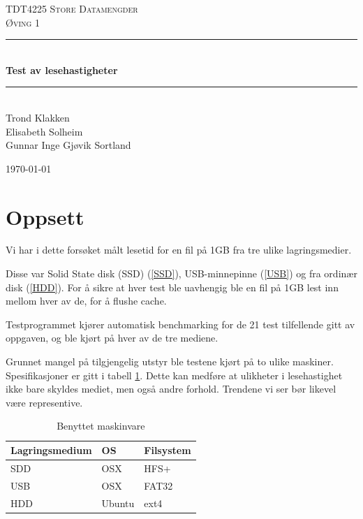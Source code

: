 \documentclass[titlepage]{article}
\newcommand{\HRule}{\rule{\linewidth}{0.5mm}}
\begin{document}
\begin{titlepage}
 
\begin{center}
 
\textsc{\LARGE TDT4225 Store Datamengder}\\[1.5cm]
\textsc{\Large Øving 1}\\[0.5cm]
 
\HRule \\[0.4cm]
{ \huge \bfseries Test av lesehastigheter}\\[0.4cm]
\HRule \\[1.5cm]

Trond Klakken \\
Elisabeth Solheim \\
Gunnar Inge Gjøvik Sortland

\vfill
 
{\large \today}
 
\end{center}

\end{titlepage}

\section{Oppsett}
Vi har i dette forsøket målt lesetid for en fil på 1GB fra tre ulike
lagringsmedier.

Disse var Solid State disk (SSD) (\ref{SSD}), USB-minnepinne
(\ref{USB}) og fra ordinær disk (\ref{HDD}). For å sikre at hver test
ble uavhengig ble en fil på 1GB lest inn mellom hver av de, for å
flushe cache.

Testprogrammet kjører automatisk benchmarking for de 21 test
tilfellende gitt av oppgaven, og ble kjørt på hver av de tre mediene.

Grunnet mangel på tilgjengelig utstyr ble testene kjørt på to ulike
maskiner. Spesifikasjoner er gitt i tabell \ref{tab:hardware}. Dette
kan medføre at ulikheter i lesehastighet ikke bare skyldes mediet, men
også andre forhold. Trendene vi ser bør likevel være representive.

\begin{table}[h!]
 \caption{Benyttet maskinvare}
 \label{tab:hardware}
  \centering
  \begin{tabular}{|l|l|l|}
\hline
\textbf{Lagringsmedium} & \textbf{OS} & Filsystem \\
\hline
\hline
SDD & OSX & HFS+ \\
USB & OSX & FAT32 \\
HDD & Ubuntu & ext4 \\

\hline
\end{tabular}
\end{table}
\end{document}
